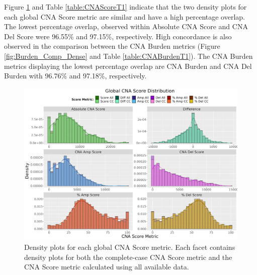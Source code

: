 Figure \ref{fig:Score_Comp_Dense} and Table \ref{table:CNAScoreT1} indicate that the two density plots for each global CNA Score metric are similar and have a high percentage overlap. The lowest percentage overlap, observed within Absolute CNA Score and CNA Del Score were 96.55\% and 97.15\%, respectively. High concordance is also observed in the comparison between the CNA Burden metrics (Figure \ref{fig:Burden_Comp_Dense} and Table \ref{table:CNABurdenT1}). The CNA Burden metrics displaying the lowest percentage overlap are CNA Burden and CNA Del Burden with 96.76\% and 97.18\%, respectively.

\vfill
\begin{figure}[!h]
\center
\includegraphics[width = 1\textwidth]{../figures/Chapter_2/Global_CNA_Score_Comparative_Density.png}
\caption[Density plots for each global CNA Score metric.]{Density plots for each global CNA Score metric. Each facet contains density plots for both the complete-case CNA Score metric and the CNA Score metric calculated using all available data.}
\label{fig:Score_Comp_Dense}
\end{figure}
\vfill 


